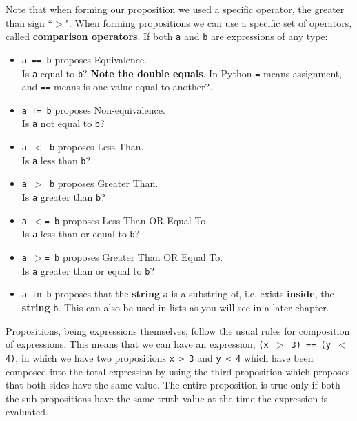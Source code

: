 Note that when forming our proposition we used a specific operator,   the greater than sign ``$>$". When forming propositions we can use a   specific set of operators, called \textbf{comparison   operators}. If both \texttt{a} and \texttt{b} are expressions of any   type:
\begin{itemize}
	\item 
\texttt{a == b} proposes Equivalence. \\
Is \texttt{a} equal to \texttt{b}?    \textbf{Note the double equals}. In Python \texttt{=} means    assignment, and \texttt{==} means is one value equal to another?.
	\item 
\texttt{a != b} proposes Non-equivalence. \\
Is \texttt{a} not equal    to \texttt{b}?
	\item 
\texttt{a $<$ b} proposes Less Than. \\
Is \texttt{a} less than    \texttt{b}?
	\item 
\texttt{a $>$ b} proposes Greater Than. \\
Is \texttt{a} greater than    \texttt{b}?
	\item 
\texttt{a $<$= b} proposes Less Than OR Equal To. \\
Is \texttt{a} less than or equal to   \texttt{b}?
	\item 
\texttt{a $>$= b} proposes Greater Than OR Equal To. \\
Is \texttt{a} greater than or equal to   \texttt{b}?
	\item 
\texttt{a in b} proposes that the \textbf{string} \texttt{a}    is a substring of, i.e. exists \textbf{inside}, the    \textbf{string} \texttt{b}. This can also be used in lists as you will see in a later chapter.
\end{itemize}

Propositions, being expressions themselves, follow the usual rules   for composition of expressions. This means that we can have an   expression, 
\texttt{(x $>$ 3) == (y $<$ 4)}, in which we have two   propositions \texttt{x > 3} and \texttt{y < 4} which have been composed into   the total expression by using the third proposition which proposes that both sides have the same value. The entire proposition is true only if both the   sub-propositions have the same truth value at the time the expression   is evaluated.

